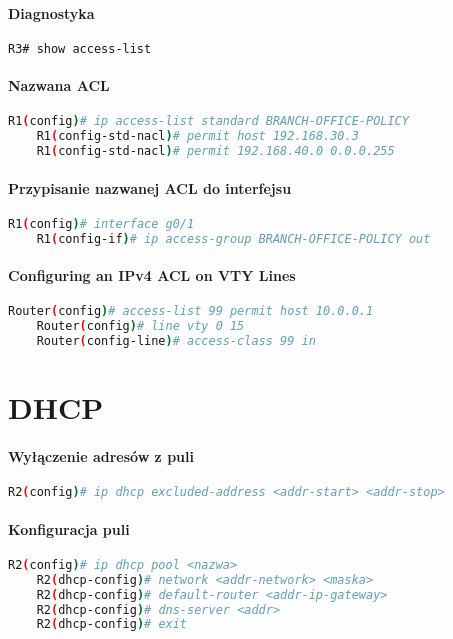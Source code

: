 \documentclass[12pt]{article}
\begin{document}
	\paragraph{Diagnostyka}
	\begin{lstlisting}[language=bash]
	R3# show access-list
	\end{lstlisting}
		
	\paragraph{Nazwana ACL}
	\begin{lstlisting}[language=bash]
	R1(config)# ip access-list standard BRANCH-OFFICE-POLICY
	R1(config-std-nacl)# permit host 192.168.30.3
	R1(config-std-nacl)# permit 192.168.40.0 0.0.0.255 
	\end{lstlisting}
		
	\paragraph{Przypisanie nazwanej ACL do interfejsu}
	\begin{lstlisting}[language=bash]
	R1(config)# interface g0/1 
	R1(config-if)# ip access-group BRANCH-OFFICE-POLICY out
	\end{lstlisting}
		
	\paragraph{Configuring an IPv4 ACL on VTY Lines}
	\begin{lstlisting}[language=bash]
	Router(config)# access-list 99 permit host 10.0.0.1
	Router(config)# line vty 0 15
	Router(config-line)# access-class 99 in
	\end{lstlisting}
		
		
\newpage

\section{DHCP}
	\paragraph{Wyłączenie adresów z puli}
	\begin{lstlisting}[language=bash]
	R2(config)# ip dhcp excluded-address <addr-start> <addr-stop>
	\end{lstlisting}
		
	\paragraph{Konfiguracja puli}
	\begin{lstlisting}[language=bash]
	R2(config)# ip dhcp pool <nazwa>
	R2(dhcp-config)# network <addr-network> <maska>
	R2(dhcp-config)# default-router <addr-ip-gateway>
	R2(dhcp-config)# dns-server <addr>
	R2(dhcp-config)# exit 
	\end{lstlisting}
		
\end{document}

